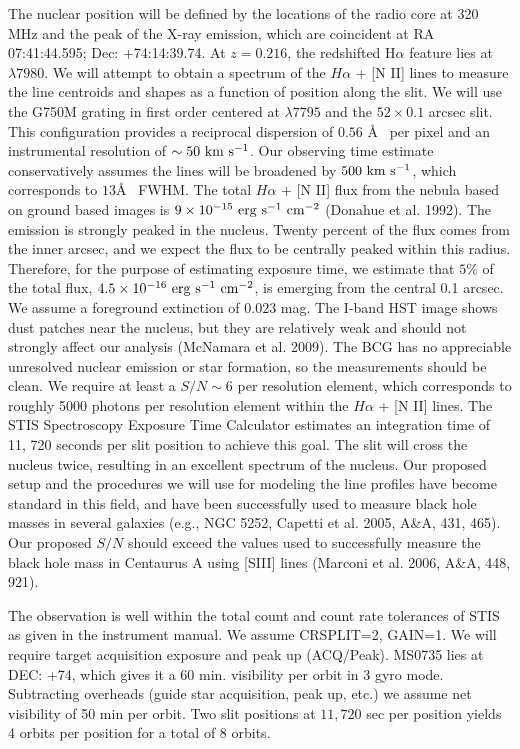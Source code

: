 \documentclass[12pt]{article}
\begin{document}
The nuclear position will be defined by the locations of the radio core at 320 MHz and the peak of the X-ray emission,
which are coincident at RA 07:41:44.595; Dec: +74:14:39.74.  At $z=0.216$, the redshifted H$\alpha$ feature lies at $\lambda 7980$.  We will 
attempt to obtain a spectrum of the $H\alpha$ + [N II] lines to measure the line centroids and shapes as
a function of position along the slit.  We will use
the G750M grating in first order centered at $\lambda 7795$ and the $52\times 0.1$ arcsec slit. 
 This configuration provides a reciprocal dispersion of $0.56$ \AA~ per pixel and an instrumental resolution of $\sim 50~\rm km~s^{-1}$.  Our observing time estimate conservatively assumes the lines will be broadened by $500~\rm km~s^{-1}$,
 which corresponds to $13$\AA~ FWHM.   The total $H\alpha$ + [N II]  flux from the nebula based on ground based images
is $9\times 10^{-15}~\rm erg~s^{-1}~cm^{-2}$ (Donahue et al. 1992).  The emission is strongly peaked in the nucleus. Twenty percent of the flux comes from the inner arcsec, and we expect the flux to be centrally peaked within this radius.  Therefore, for the purpose
of estimating exposure time, we estimate that $5\%$ of the total flux, $4.5\times 10^{-16}~\rm erg~s^{-1}~cm^{-2}$, is emerging from the central 0.1 arcsec.  We assume a foreground extinction of $0.023$ mag.  The I-band HST image
shows dust patches near the nucleus, but they are relatively weak and should not strongly affect our analysis (McNamara
et al. 2009).  The BCG has no appreciable unresolved nuclear emission or star formation, so the measurements should
be clean.   We require at least
a $S/N\sim 6$ per resolution element, which corresponds to roughly 5000 photons per resolution element within
the $H\alpha$ + [N II] lines.  The STIS Spectroscopy Exposure Time Calculator estimates an integration time of 11, 720 seconds per slit position to achieve this goal.  The slit will cross the nucleus twice, resulting in an excellent spectrum
of the nucleus.   Our proposed setup and the procedures we will use for modeling the line profiles have become standard in this field, and have been successfully used to
measure black hole masses in several galaxies (e.g., NGC 5252, Capetti et al. 2005, A\&A, 431, 465).  Our
proposed $S/N$ should exceed the values used to successfully measure the black hole mass in Centaurus A using
[SIII] lines (Marconi et al. 2006, A\&A, 448, 921).

 
The observation is well within the total count and count rate tolerances of STIS as given in the instrument manual.  
We assume CRSPLIT=2, GAIN=1.  We will require target acquisition exposure and peak up (ACQ/Peak).  MS0735
lies at DEC: +74, which gives it a 60 min. visibility per orbit in 3 gyro mode.  Subtracting overheads (guide star
acquisition, peak up, etc.) we assume net visibility of 50 min per orbit.  Two slit positions at $11, 720$ sec per position
yields 4 orbits per position for a total of 8 orbits.
\end{document}
